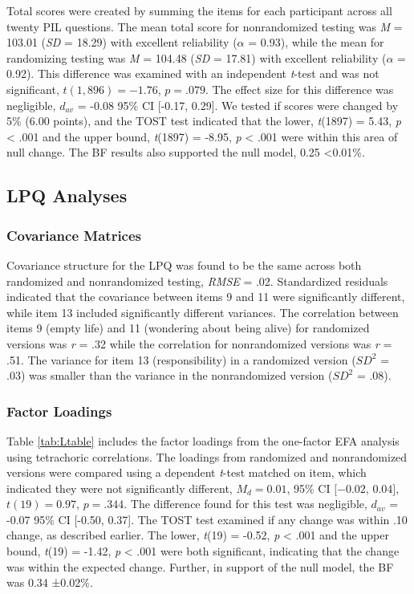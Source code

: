 \documentclass[english,man, mask]{apa6}
\theoremstyle{definition}
\theoremstyle{definition}
\theoremstyle{definition}
\theoremstyle{remark}
\begin{document}
Total scores were created by summing the items for each participant
across all twenty PIL questions. The mean total score for nonrandomized
testing was \emph{M} = 103.01 (\emph{SD} = 18.29) with excellent
reliability (\(\alpha\) = 0.93), while the mean for randomizing testing
was \emph{M} = 104.48 (\emph{SD} = 17.81) with excellent reliability
(\(\alpha\) = 0.92). This difference was examined with an independent
\emph{t}-test and was not significant, \(t(1,896) = -1.76\),
\(p = .079\). The effect size for this difference was negligible,
\(d_{av}\) = -0.08 95\% CI {[}-0.17, 0.29{]}. We tested if scores were
changed by 5\% (6.00 points), and the TOST test indicated that the
lower, \emph{t}(1897) = 5.43, \emph{p} \textless{} .001 and the upper
bound, \emph{t}(1897) = -8.95, \emph{p} \textless{} .001 were within
this area of null change. The BF results also supported the null model,
0.25 \textless{}0.01\%.

\subsection{LPQ Analyses}\label{lpq-analyses}

\subsubsection{Covariance Matrices}\label{covariance-matrices-1}

Covariance structure for the LPQ was found to be the same across both
randomized and nonrandomized testing, \emph{RMSE} = .02. Standardized
residuals indicated that the covariance between items 9 and 11 were
significantly different, while item 13 included significantly different
variances. The correlation between items 9 (empty life) and 11
(wondering about being alive) for randomized versions was \emph{r} = .32
while the correlation for nonrandomized versions was \emph{r} = .51. The
variance for item 13 (responsibility) in a randomized version (\(SD^2\)
= .03) was smaller than the variance in the nonrandomized version
(\(SD^2\) = .08).

\subsubsection{Factor Loadings}\label{factor-loadings-1}

Table \ref{tab:Ltable} includes the factor loadings from the one-factor
EFA analysis using tetrachoric correlations. The loadings from
randomized and nonrandomized versions were compared using a dependent
\emph{t}-test matched on item, which indicated they were not
significantly different, \(M_d = 0.01\), 95\% CI \([-0.02\), \(0.04]\),
\(t(19) = 0.97\), \(p = .344\). The difference found for this test was
negligible, \(d_{av}\) = -0.07 95\% CI {[}-0.50, 0.37{]}. The TOST test
examined if any change was within .10 change, as described earlier. The
lower, \emph{t}(19) = -0.52, \emph{p} \textless{} .001 and the upper
bound, \emph{t}(19) = -1.42, \emph{p} \textless{} .001 were both
significant, indicating that the change was within the expected change.
Further, in support of the null model, the BF was 0.34 ±0.02\%.
\end{document}
